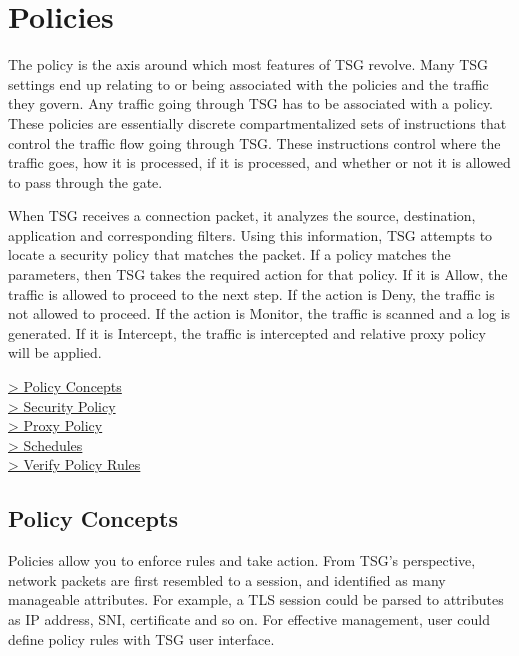 %
\chapter*{\hypertarget{link:Policies}{Policies}}
\label{sec:policies}

The policy is the axis around which most features of TSG revolve. Many TSG settings end up relating to or being associated with the policies and the traffic they govern. 
Any traffic going through TSG has to be associated with a policy. These policies are essentially discrete compartmentalized sets of instructions that control the traffic 
flow going through TSG. These instructions control where the traffic goes, how it is processed, if it is processed, and whether or not it is allowed to pass through the gate.


When TSG receives a connection packet, it analyzes the source, destination, application and corresponding filters. Using this information, 
TSG attempts to locate a security policy that matches the packet. If a policy matches the parameters, then TSG takes the required action for that policy. 
If it is Allow, the traffic is allowed to proceed to the next step. If the action is Deny, the traffic is not allowed to proceed. If the action is Monitor, 
the traffic is scanned and a log is generated. If it is Intercept, the traffic is intercepted and relative proxy policy will be applied. 

{
\color{linkblue}
\hyperlink{link:Policy Concepts}{> Policy Concepts} \\
\hyperlink{link:Security Policy}{> Security Policy} \\
\hyperlink{link:Proxy Policy}{> Proxy Policy}\\
\hyperlink{link:Schedules}{> Schedules}\\
\hyperlink{link:Verify Policy Rules}{> Verify Policy Rules}\\
}
\clearpage

\section*{\hypertarget{link:Policy Concepts}{Policy Concepts}}
\label{sec:policies:concepts}

Policies allow you to enforce rules and take action. From TSG’s perspective, network packets are first resembled to a session, and identified as many manageable attributes. 
For example, a TLS session could be parsed to attributes as IP address, SNI, certificate and so on. For effective management, user could define policy rules with TSG user interface. 


